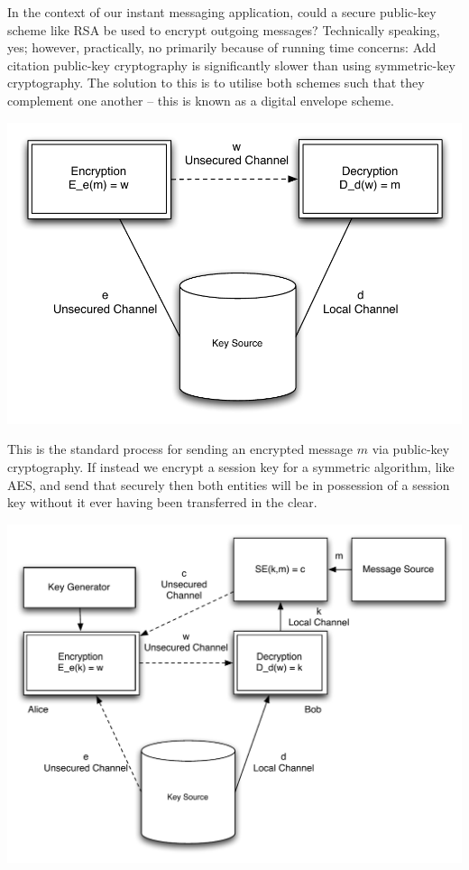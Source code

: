 In the context of our instant messaging application, could a secure public-key scheme like RSA be used to encrypt outgoing messages? Technically speaking, yes; however, practically, no primarily because of running time concerns: {\color{red}Add citation} public-key cryptography is significantly slower than using symmetric-key cryptography. The solution to this is to utilise both schemes such that they complement one another -- this is known as a digital envelope scheme.

\begin{center}
  \includegraphics[scale=0.6]{./Figures/3-7a.pdf}
\end{center}

This is the standard process for sending an encrypted message $m$ via public-key cryptography. If instead we encrypt a session key for a symmetric algorithm, like AES, and send that securely then both entities will be in possession of a session key without it ever having been transferred in the clear.

\begin{center}
  \includegraphics[scale=0.6]{./Figures/3-7b.pdf}
\end{center}

